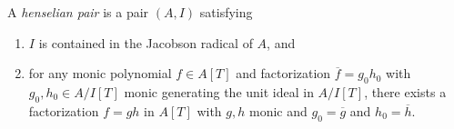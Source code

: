 \begin{definition}
\label{definition-henselian-pair}
A {\it henselian pair} is a pair $(A, I)$ satisfying
\begin{enumerate}
\item $I$ is contained in the Jacobson radical of $A$, and
\item for any monic polynomial $f \in A[T]$ and factorization
$\overline{f} = g_0h_0$ with $g_0, h_0 \in A/I[T]$ monic
generating the unit ideal in $A/I[T]$, there
exists a factorization $f = gh$ in $A[T]$ with $g, h$ monic
and $g_0 = \overline{g}$ and $h_0 = \overline{h}$.
\end{enumerate}
\end{definition}